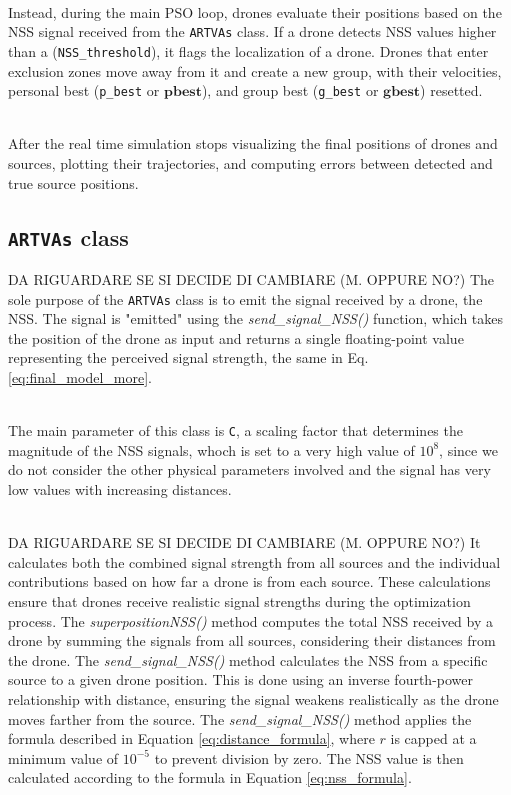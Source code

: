 \noindent\\
Instead, during the main PSO loop, drones evaluate 
their positions based on the NSS signal received from the \texttt{ARTVAs} class. 
If a drone detects NSS values higher than a (\texttt{NSS\_threshold}),
it flags the localization of a drone.
Drones that enter exclusion zones move away from it and 
create a new group, with their velocities, 
personal best (\texttt{p\_best} or $\mathbf{pbest}$), and group best 
(\texttt{g\_best} or $\mathbf{gbest}$) resetted.

\noindent\\
After the real time simulation stops visualizing the final 
positions of drones and sources, plotting their trajectories, 
and computing errors between detected and true source positions. 

\subsection{\texttt{ARTVAs} class}
DA RIGUARDARE SE SI DECIDE DI CAMBIARE (M. OPPURE NO?)
The sole purpose of the \texttt{ARTVAs} class is to 
emit the signal received by a drone, the NSS. 
The signal is "emitted" using the \textit{send\_signal\_NSS()} 
function, which takes the position of the drone as 
input and returns a single floating-point value representing 
the perceived signal strength, the same in Eq.\ref{eq:final_model_more}.

\noindent\\
The main parameter of this class is \texttt{C}, a 
scaling factor that determines the magnitude of the NSS signals, 
whoch is set to a very high value of $10^8$, since we do not consider
the other physical parameters involved and the signal has very low values
with increasing distances.

\noindent\\
DA RIGUARDARE SE SI DECIDE DI CAMBIARE (M. OPPURE NO?)
It calculates both the combined signal strength 
from all sources and the individual contributions based 
on how far a drone is from each source. 
These calculations ensure that drones receive 
realistic signal strengths during the optimization process.
The \textit{superpositionNSS()} method computes the total 
NSS received by a drone by summing the signals from all sources, 
considering their distances from the drone. 
The \textit{send\_signal\_NSS()} method calculates the NSS from a
specific source to a given drone position. 
This is done using an inverse fourth-power relationship with distance, 
ensuring the signal weakens realistically 
as the drone moves farther from the source.
The \textit{send\_signal\_NSS()} method applies the formula 
described in Equation \ref{eq:distance_formula}, 
where \texttt{\(r\)} is capped at a minimum value of $10^{-5}$ 
to prevent division by zero. The NSS value is then calculated according 
to the formula in Equation \ref{eq:nss_formula}.

